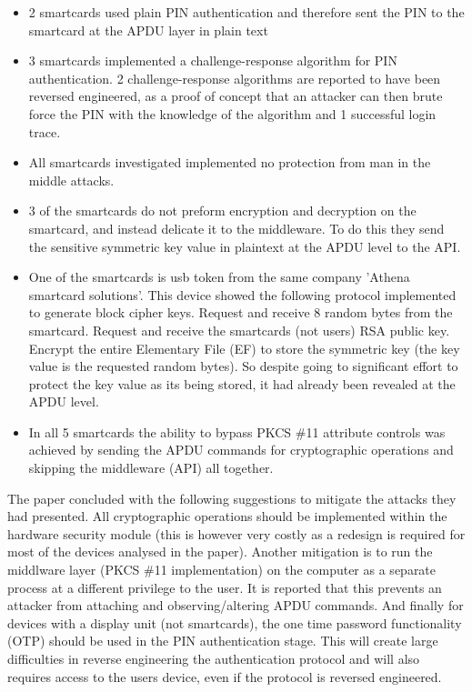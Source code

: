 \documentclass[bsc,frontabs,twoside,singlespacing,parskip,deptreport]{infthesis}     %
\begin{document}
\begin{itemize}
\item 2 smartcards used plain PIN authentication and therefore sent the PIN to the smartcard at the APDU layer in plain text
\item 3 smartcards implemented a challenge-response algorithm for PIN authentication. 2 challenge-response algorithms are reported to have been reversed engineered, as a proof of concept that an attacker can then brute force the PIN with the knowledge of the algorithm and 1 successful login trace.
\item All smartcards investigated implemented no protection from man in the middle attacks.
\item 3 of the smartcards do not preform encryption and decryption on the smartcard, and instead delicate it to the middleware. To do this they send the sensitive symmetric key value in plaintext at the APDU level to the API.
\item One of the smartcards is usb token from the same company 'Athena smartcard solutions'. This device showed the following protocol implemented to generate block cipher keys. Request and receive 8 random bytes from the smartcard. Request and receive the smartcards (not users) RSA public key. Encrypt the entire Elementary File (EF) to store the symmetric key (the key value is the requested random bytes). So despite going to significant effort to protect the key value as its being stored, it had already been revealed at the APDU level.
\item In all 5 smartcards the ability to bypass PKCS \#11 attribute controls was achieved by sending the APDU commands for cryptographic operations and skipping the middleware (API) all together.
\end{itemize}


The paper concluded with the following suggestions to mitigate the attacks they had presented. All cryptographic operations should be implemented within the hardware security module (this is however very costly as a redesign is required for most of the devices analysed in the paper). Another mitigation is to run the middlware layer (PKCS \#11 implementation) on the computer as a separate process at a different privilege to the user. It is reported that this prevents an attacker from attaching and observing/altering APDU commands. And finally for devices with a display unit (not smartcards), the one time password functionality (OTP) should be used in the PIN authentication stage. This will create large difficulties in reverse engineering the authentication protocol and will also requires access to the users device, even if the protocol is reversed engineered.
\end{document}
